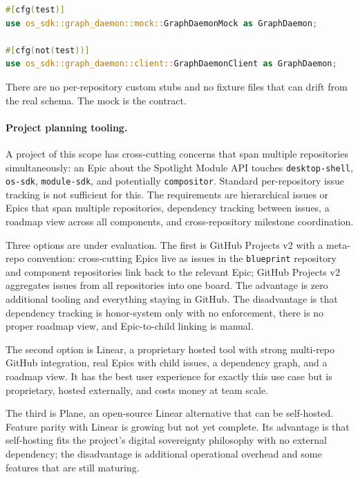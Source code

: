 \begin{lstlisting}[language=Rust, caption={Conditional mock usage in tests}]
#[cfg(test)]
use os_sdk::graph_daemon::mock::GraphDaemonMock as GraphDaemon;

#[cfg(not(test))]
use os_sdk::graph_daemon::client::GraphDaemonClient as GraphDaemon;
\end{lstlisting}

There are no per-repository custom stubs and no fixture files that can drift
from the real schema. The mock is the contract.

\paragraph{Project planning tooling.}
A project of this scope has cross-cutting concerns that span multiple
repositories simultaneously: an Epic about the Spotlight Module API touches
\texttt{desktop-shell}, \texttt{os-sdk}, \texttt{module-sdk}, and potentially
\texttt{compositor}. Standard per-repository issue tracking is not sufficient
for this. The requirements are hierarchical issues or Epics that span multiple
repositories, dependency tracking between issues, a roadmap view across all
components, and cross-repository milestone coordination.

Three options are under evaluation. The first is GitHub Projects v2 with a
meta-repo convention: cross-cutting Epics live as issues in the
\texttt{blueprint} repository and component repositories link back to the
relevant Epic; GitHub Projects v2 aggregates issues from all repositories into
one board. The advantage is zero additional tooling and everything staying
in GitHub. The disadvantage is that dependency tracking is honor-system only
with no enforcement, there is no proper roadmap view, and Epic-to-child
linking is manual.

The second option is Linear, a proprietary hosted tool with strong multi-repo
GitHub integration, real Epics with child issues, a dependency graph, and a
roadmap view. It has the best user experience for exactly this use case but
is proprietary, hosted externally, and costs money at team scale.

The third is Plane, an open-source Linear alternative that can be self-hosted.
Feature parity with Linear is growing but not yet complete. Its advantage is
that self-hosting fits the project's digital sovereignty philosophy with no
external dependency; the disadvantage is additional operational overhead and
some features that are still maturing.

